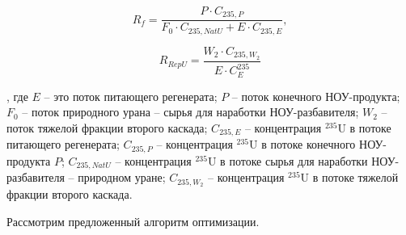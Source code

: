 \begin{equation} \label{Rec2} 
    R_f = \frac{P \cdot C_{235,P}}{F_0 \cdot C_{235,NatU} + E \cdot C_{235,E}}, 
\end{equation} 

\begin{equation} \label{RecR2} 
    R_{RepU} = \frac{W_2\cdot C_{235,W_2}}{E \cdot C_{E}^{235}}        
\end{equation} 

, где $E$ -- это поток питающего регенерата; $P$ -- поток конечного НОУ-продукта; $F_0$ -- поток природного урана -- сырья для наработки НОУ-разбавителя; $W_2$ -- поток тяжелой фракции второго каскада;
$C_{235,E}$ -- концентрация $^{235}$U в потоке питающего регенерата; $C_{235,P}$ -- концентрация $^{235}$U в потоке конечного НОУ-продукта $P$; $C_{235,NatU}$ -- концентрация $^{235}$U в потоке сырья для наработки НОУ-разбавителя -- природном уране; $C_{235,W_2}$ -- концентрация $^{235}$U в потоке тяжелой фракции второго каскада.

Рассмотрим предложенный алгоритм оптимизации.

